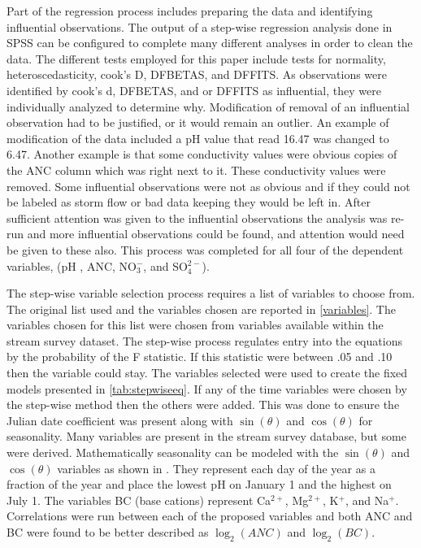 Part of the regression process includes preparing the data and identifying influential observations. The output of a step-wise regression analysis done in SPSS can be configured to complete many different analyses in order to clean the data. The different tests employed for this paper include tests for normality, heteroscedasticity, cook's D, DFBETAS, and DFFITS. As observations were identified by cook's d, DFBETAS, and or DFFITS as influential, they were individually analyzed to determine why. Modification of removal of an influential observation had to be justified, or it would remain an outlier. An example of modification of the data included a pH value that read 16.47 was changed to 6.47. Another example is that some conductivity values were obvious copies of the ANC column which was right next to it. These conductivity values were removed. Some influential observations were not as obvious and if they could not be labeled as storm flow or bad data keeping they would be left in. After sufficient attention was given to the influential observations the analysis was re-run and more influential observations could be found, and attention would need be given to these also. This process was completed for all four of the dependent variables, (pH , ANC, NO$_3^-$, and SO$_4^{2-}$).
 
 The step-wise variable selection process requires a list of variables to choose from.  The original list used and the variables chosen are reported in \autoref{variables}.  The variables chosen for this list were chosen from variables available within the stream survey dataset.  The step-wise process regulates entry into the equations by the probability of the F statistic.  If this statistic were between .05 and .10 then the variable could stay.   The variables selected were used to create the fixed models presented in \autoref{tab:stepwiseeq}.  If any of the time variables were chosen by the step-wise method then the others were added.  This was done to ensure the Julian date coefficient was present along with $\sin(\theta)$ and $\cos(\theta)$ for seasonality.  Many variables are present in the stream survey database, but some were derived.  Mathematically seasonality can be modeled with the $\sin(\theta)$ and $\cos(\theta)$ variables as shown in \citet{helsel1992statistical}.  They represent each day of the year as a fraction of the year and place the lowest pH on January 1 and the highest on July 1.  The variables BC (base cations) represent Ca$^{2+}$, Mg$^{2+}$, K$^+$, and Na$^+$.  Correlations were run between each of the proposed variables  and both ANC and BC were found to be better described as $\log_2(ANC)$ and $\log_2(BC)$.
 
